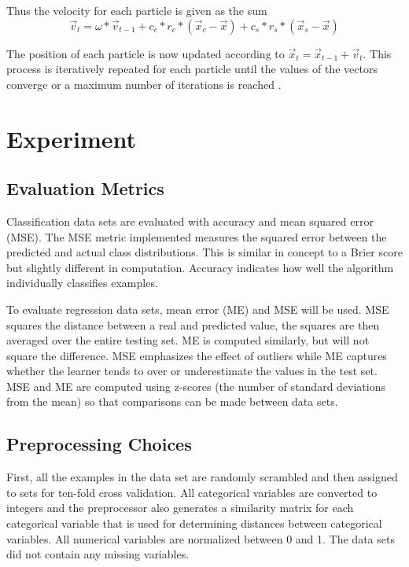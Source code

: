 \documentclass[twoside,11pt]{article}
\begin{document}
	Thus the velocity for each particle is given as the sum
	$$\vec{v}_t = \omega * \vec{v}_{t-1} + c_c*r_c*(\vec{x}_c - \vec{x}) + c_s*r_s*(\vec{x}_s - \vec{x})$$

	The position of each particle is now updated according to $\vec{x}_t = \vec{x}_{t-1} + \vec{v}_t$. This process is iteratively repeated for each particle until the values of the vectors converge or a maximum number of iterations is reached \citep{og-pso}.

\section{Experiment}

\subsection{Evaluation Metrics}

	Classification data sets are evaluated with accuracy and mean squared error (MSE).
	The MSE metric implemented measures the squared error between the predicted and actual class distributions.
	This is similar in concept to a Brier score but slightly different in computation. Accuracy indicates how well the algorithm individually classifies examples.

	To evaluate regression data sets, mean error (ME) and MSE will be used. MSE squares the distance between a real and predicted value, the squares are then averaged over the entire testing set.
	ME is computed similarly, but will not square the difference. MSE emphasizes the effect of outliers while ME captures whether the learner tends to over or underestimate the values in the test set.
	MSE and ME are computed using z-scores (the number of standard deviations from the mean) so that comparisons can be made between data sets.

\subsection{Preprocessing Choices}

	First, all the examples in the data set are randomly scrambled and then assigned to sets for ten-fold cross validation.
	All categorical variables are converted to integers
	and the preprocessor also generates a similarity matrix for each categorical variable that is used for determining distances between categorical variables.
	All numerical variables are normalized between 0 and 1.
	The data sets did not contain any missing variables.
\end{document}
